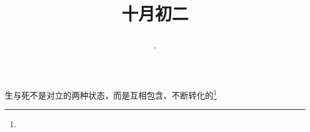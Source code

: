 \title{\date[d=2,m=11,y=2024][year:cn-y,年,month:cn,day:cn,日,·,weekday]·十月初二 }
生与死不是对立的两种状态，而是互相包含、不断转化的\footnote{ }

